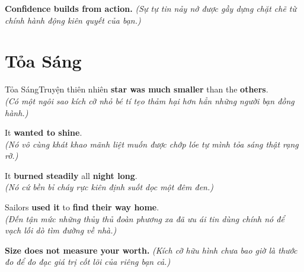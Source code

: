 \begin{baihoc}
  \textbf{Confidence builds from action.} \textit{(Sự tự tin nảy nở được gầy dựng chặt chẽ từ chính hành động kiên quyết của bạn.)}
\end{baihoc}

\vspace{0.8cm}

\ngayDay{}
\section{Tỏa Sáng}
\begin{truyen}{Tỏa Sáng}{Truyện thiên nhiên}
 \textbf{star was much smaller} than the \textbf{others}.\\
\textit{(Có một ngôi sao kích cỡ nhỏ bé tí tẹo thảm hại hơn hẳn những người bạn đồng hành.)}

It \textbf{wanted to shine}.\\
\textit{(Nó vô cùng khát khao mãnh liệt muốn được chớp lóe tự mình tỏa sáng thật rạng rỡ.)}

It \textbf{burned steadily} all \textbf{night long}.\\
\textit{(Nó cứ bền bỉ cháy rực kiên định suốt dọc một đêm đen.)}

Sailors \textbf{used it} to \textbf{find their way home}.\\
\textit{(Đến tận mức những thủy thủ đoàn phương xa đã ưu ái tin dùng chính nó để vạch lối dò tìm đường về nhà.)}
\end{truyen}

\begin{baihoc}
  \textbf{Size does not measure your worth.} \textit{(Kích cỡ hữu hình chưa bao giờ là thước đo để đo đạc giá trị cốt lõi của riêng bạn cả.)}
\end{baihoc}
